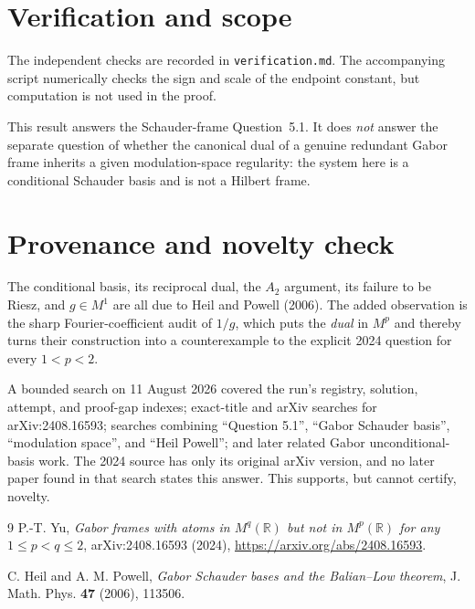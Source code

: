 \documentclass[11pt]{article}
\begin{document}
\section{Verification and scope}

The independent checks are recorded in \texttt{verification.md}.  The
accompanying script numerically checks the sign and scale of the endpoint
constant, but computation is not used in the proof.

This result answers the Schauder-frame Question~5.1.  It does \emph{not}
answer the separate question of whether the canonical dual of a genuine
redundant Gabor frame inherits a given modulation-space regularity: the
system here is a conditional Schauder basis and is not a Hilbert frame.

\section{Provenance and novelty check}

The conditional basis, its reciprocal dual, the $A_2$ argument, its failure
to be Riesz, and $g\in M^1$ are all due to Heil and Powell (2006).  The added
observation is the sharp Fourier-coefficient audit of $1/g$, which puts the
\emph{dual} in $M^p$ and thereby turns their construction into a
counterexample to the explicit 2024 question for every $1<p<2$.

A bounded search on 11 August 2026 covered the run's registry, solution,
attempt, and proof-gap indexes; exact-title and arXiv searches for
arXiv:2408.16593; searches combining ``Question 5.1'', ``Gabor Schauder
basis'', ``modulation space'', and ``Heil Powell''; and later related Gabor
unconditional-basis work.  The 2024 source has only its original arXiv
version, and no later paper found in that search states this answer.  This
supports, but cannot certify, novelty.

\begin{thebibliography}{9}
P.-T. Yu,
\emph{Gabor frames with atoms in $M^q(\mathbb R)$ but not in
$M^p(\mathbb R)$ for any $1\leq p<q\leq2$},
arXiv:2408.16593 (2024),
\url{https://arxiv.org/abs/2408.16593}.

C. Heil and A. M. Powell,
\emph{Gabor Schauder bases and the Balian--Low theorem},
J. Math. Phys. \textbf{47} (2006), 113506.
\end{thebibliography}
\end{document}
